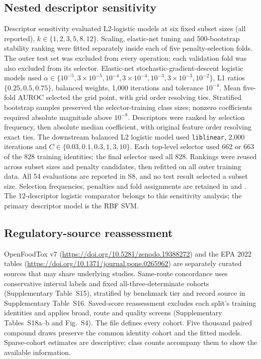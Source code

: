 \documentclass[10pt]{article}
\begin{document}
\subsection*{Nested descriptor sensitivity}
Descriptor sensitivity evaluated L2-logistic models at six fixed subset sizes (all reported), \(k\in\{1,2,3,5,8,12\}\). Scaling, elastic-net tuning\cite{SiZou2005} and 500-bootstrap stability ranking were fitted separately inside each of five penalty-selection folds. The outer test set was excluded from every operation; each validation fold was also excluded from its selector. Elastic-net stochastic-gradient-descent logistic models used \(\alpha\in\{10^{-5},3\times10^{-5},10^{-4},3\times10^{-4},10^{-3},3\times10^{-3},10^{-2}\}\), L1 ratios \(\{0.25,0.5,0.75\}\), balanced weights, 1,000 iterations and tolerance \(10^{-4}\). Mean five-fold AUROC selected the grid point, with grid order resolving ties. Stratified bootstrap samples preserved the selector-training class sizes; nonzero coefficients required absolute magnitude above \(10^{-8}\). Descriptors were ranked by selection frequency, then absolute median coefficient, with original feature order resolving exact ties. The downstream balanced L2 logistic model used \texttt{liblinear}, 2,000 iterations and \(C\in\{0.03,0.1,0.3,1,3,10\}\). Each top-level selector used 662 or 663 of the 828 training identities; the final selector used all 828. Rankings were reused across subset sizes and penalty candidates, then refitted on all outer training data. All 54 evaluations are reported in S8, and no test result selected a subset size. Selection frequencies, penalties and fold assignments are retained in  and . The 12-descriptor logistic comparator belongs to this sensitivity analysis; the primary descriptor model is the RBF SVM.

\subsection*{Regulatory-source reassessment}
OpenFoodTox v7 (\url{https://doi.org/10.5281/zenodo.19388272}) and the EPA 2022 tables (\url{https://doi.org/10.1371/journal.pone.0265962}) are separately curated sources that may share underlying studies. Same-route concordance uses conservative interval labels and fixed all-three-determinate cohorts (Supplementary Table~S15), stratified by benchmark tier and record source in Supplementary Table~S16. Saved-score reassessment excludes each split's training identities and applies broad, route and quality screens (Supplementary Tables~S18a--b and Fig.~S4). The  file defines every cohort. Five thousand paired compound draws preserve the common identity cohort and the fitted models. Sparse-cohort estimates are descriptive; class counts accompany them to show the available information.
\end{document}
